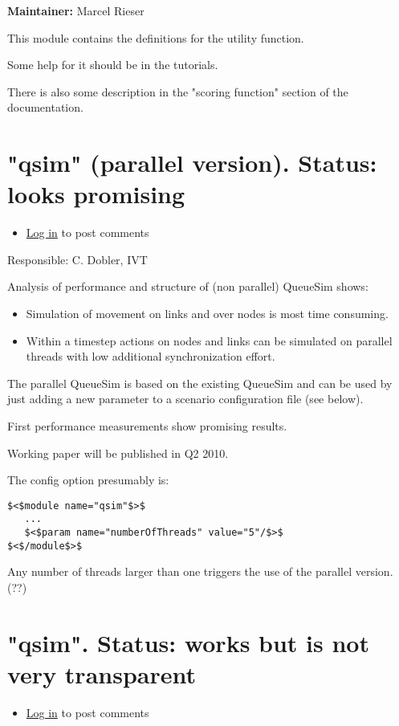 \documentclass[a4paper,11pt]{report}
\begin{document}
\textbf{Maintainer:} Marcel Rieser

This module contains the definitions for the utility function.

Some help for it should be in the tutorials.

There is also some description in the "scoring function" section of the documentation.

\vfill\eject
\section{"qsim" (parallel version). Status: looks promising}
\begin{itemize}
	\item \href{http://www.matsim.org/user/login?destination=comment/reply/378%23comment-form}{Log in} to post comments
\end{itemize}

Responsible: C. Dobler, IVT

Analysis of performance and structure of (non parallel) QueueSim shows:
\begin{itemize}
	\item Simulation of movement on links and over nodes is most time consuming.
	\item Within a timestep actions on nodes and links can be simulated on parallel threads with low additional synchronization effort.
\end{itemize}

The  parallel QueueSim is based on the existing QueueSim and can be used by  just adding a new parameter to a scenario configuration file (see  below).

First performance measurements show promising results.

Working paper will be published in Q2 2010.



The config option presumably is:
\begin{verbatim}
$<$module name="qsim"$>$
   ...
   $<$param name="numberOfThreads" value="5"/$>$
$<$/module$>$

\end{verbatim}

Any number of threads larger than one triggers the use of the parallel version. (??)

\vfill\eject
\section{"qsim". Status: works but is not very transparent}
\begin{itemize}
	\item \href{http://www.matsim.org/user/login?destination=comment/reply/397%23comment-form}{Log in} to post comments
\end{itemize}
\end{document}
